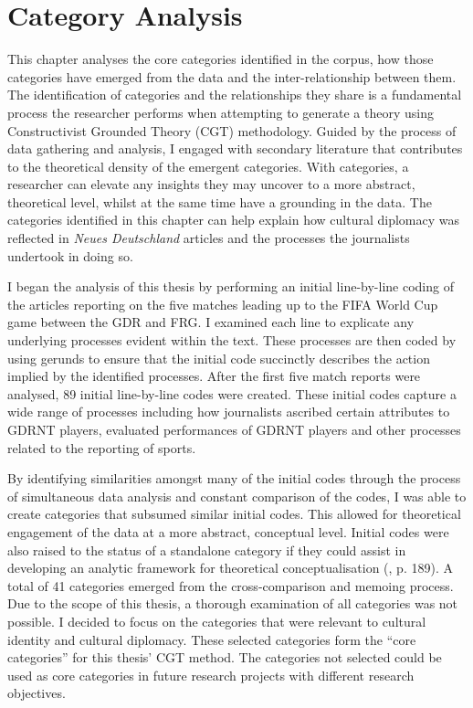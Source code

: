 \chapter{Category Analysis\label{cha:catanalysis}}

This chapter analyses the core categories identified in the corpus, how those categories have emerged from the data and the inter-relationship between them. The identification of categories and the relationships they share is a fundamental process the researcher performs when attempting to generate a theory using Constructivist Grounded Theory (CGT) methodology. Guided by the process of data gathering and analysis, I engaged with secondary literature that contributes to the theoretical density of the emergent categories. With categories, a researcher can elevate any insights they may uncover to a more abstract, theoretical level, whilst at the same time have a grounding in the data. The categories identified in this chapter can help explain how cultural diplomacy was reflected in \textit{Neues Deutschland} articles and the processes the journalists undertook in doing so.

I began the analysis of this thesis by performing an initial line-by-line coding of the articles reporting on the five matches leading up to the FIFA World Cup game between the GDR and FRG. I examined each line to explicate any underlying processes evident within the text. These processes are then coded by using gerunds to ensure that the initial code succinctly describes the action implied by the identified processes. After the first five match reports were analysed, 89 initial line-by-line codes were created. These initial codes capture a wide range of processes including how journalists ascribed certain attributes to GDRNT players, evaluated performances of GDRNT players and other processes related to the reporting of sports.

By identifying similarities amongst many of the initial codes through the process of simultaneous data analysis and constant comparison of the codes, I was able to create categories that subsumed similar initial codes. This allowed for theoretical engagement of the data at a more abstract, conceptual level. Initial codes were also raised to the status of a standalone category if they could assist in developing an analytic framework for theoretical conceptualisation (\cite{charmaz2014}, p. 189). A total of 41 categories emerged from the cross-comparison and memoing process. Due to the scope of this thesis, a thorough examination of all categories was not possible. I decided to focus on the categories that were relevant to cultural identity and cultural diplomacy. These selected categories form the “core categories” for this thesis’ CGT method. The categories not selected could be used as core categories in future research projects with different research objectives.

